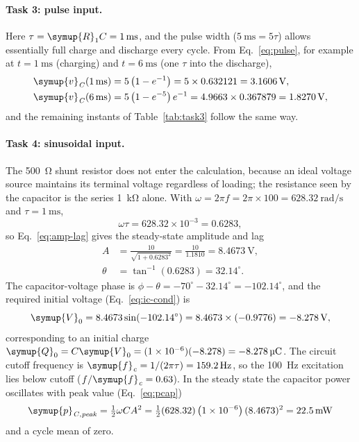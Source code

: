 \documentclass[12pt,a4paper]{article}
\begin{document}
	\paragraph{Task 3: pulse input.}
	Here $\tau = \symup{R}_{1} C = \SI{1}{\milli\second}$, and the pulse width
	($\SI{5}{\milli\second} = 5\tau$) allows essentially full charge and
	discharge every cycle.  From Eq.~\eqref{eq:pulse}, for example at
	$t = \SI{1}{\milli\second}$ (charging) and $t = \SI{6}{\milli\second}$
	(one $\tau$ into the discharge),
	\begin{align}
		\symup{v}_{\mathit{C}}(\SI{1}{\milli\second}) &= 5\left(1 - e^{-1}\right)
		= 5 \times 0.632121 = \SI{3.1606}{\volt}, \\
		\symup{v}_{\mathit{C}}(\SI{6}{\milli\second}) &= 5\left(1 - e^{-5}\right)e^{-1}
		= 4.9663 \times 0.367879 = \SI{1.8270}{\volt},
	\end{align}
	and the remaining instants of Table~\ref{tab:task3} follow the same
	way.
	
	\paragraph{Task 4: sinusoidal input.}
	The \SI{500}{\ohm} shunt resistor does not enter the calculation,
	because an ideal voltage source maintains its terminal voltage
	regardless of loading; the resistance seen by the capacitor is the
	series \SI{1}{\kilo\ohm} alone.  With $\omega = 2\pi f = 2\pi \times
	100 = \SI{628.32}{\radian\per\second}$ and
	$\tau = \SI{1}{\milli\second}$,
	\begin{equation}
		\omega\tau = 628.32 \times 10^{-3} = 0.6283,
	\end{equation}
	so Eq.~\eqref{eq:amp-lag} gives the steady-state amplitude and lag
	\begin{align}
		A &= \frac{10}{\sqrt{1 + 0.6283^2}}
		= \frac{10}{1.1810} = \SI{8.4673}{\volt},\\
		\theta &= \tan^{-1}(0.6283) = 32.14^{\circ}.
	\end{align}
	The capacitor-voltage phase is $\phi - \theta = -70^\circ - 32.14^\circ
	= -102.14^\circ$, and the required initial voltage
	(Eq.~\eqref{eq:ic-cond}) is
	\begin{equation}
		\symup{V}_{0} = 8.4673\sin(-102.14^{\circ})
		= 8.4673 \times (-0.9776) = \SI{-8.278}{\volt},
	\end{equation}
	corresponding to an initial charge
	$\symup{Q}_{0} = C \symup{V}_{0} = (1\times10^{-6})(-8.278) =
	\SI{-8.278}{\micro\coulomb}$.  The circuit cutoff frequency is
	$\symup{f}_{\mathit{c}} = 1/(2\pi\tau) = \SI{159.2}{\hertz}$, so the
	\SI{100}{\hertz} excitation lies below cutoff
	($f/\symup{f}_{\mathit{c}} = 0.63$).  In the steady state the capacitor power
	oscillates with peak value (Eq.~\eqref{eq:pcap})
	\begin{equation}
		\symup{p}_{\mathit{C,peak}} = \tfrac{1}{2}\omega C A^{2}
		= \tfrac{1}{2}(628.32)\left(1\times10^{-6}\right)(8.4673)^2
		= \SI{22.5}{\milli\watt}
	\end{equation}
	and a cycle mean of zero.
	
\end{document}
